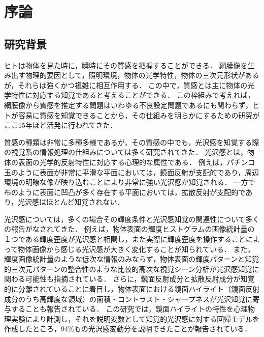 \chapter{序論}
    \section{研究背景}
        ヒトは物体を見た時に，瞬時にその質感を把握することができる．
        網膜像を生み出す物理的要因として，照明環境，物体の光学特性，物体の三次元形状があるが，それらは強くかつ複雑に相互作用する．
        この中で，質感とは主に物体の光学特性に対応する知覚であると考えることができる．
        この枠組みで考えれば，網膜像から質感を推定する問題はいわゆる不良設定問題であるにも関わらず，ヒトが容易に質感を知覚できることから，その仕組みを明らかにするための研究がここ15年ほど活発に行われてきた．

        質感の種類は非常に多種多様であるが\cite{Material}，その質感の中でも，光沢感を知覚する際の視覚系の情報処理の仕組みについては多く研究されてきた．
        光沢感とは，物体の表面の光学的反射特性に対応する心理的な属性である．
        例えば，パチンコ玉のように表面が非常に平滑な平面においては，鏡面反射が支配的であり，周辺環境の明瞭な像が映り込むことにより非常に強い光沢感が知覚される．
        一方で布のように表面に凹凸が多く存在する平面においては，拡散反射が支配的であり，光沢感はほとんど知覚されない．

        光沢感については，多くの場合その輝度条件と光沢感知覚の関連性について多くの報告がなされてきた．
        例えば，物体表面の輝度ヒストグラムの画像統計量の１つである輝度歪度が光沢感と相関し，また実際に輝度歪度を操作することによって物体画像から感じる光沢感が大きく変化することが知られている．\cite{Motoyoshi}
        また，輝度画像統計量のような低次な情報のみならず，物体表面の輝度パターンと知覚的三次元パターンの整合性のような比較的高次な視覚シーン分析が光沢感知覚に関わる可能性も指摘されている．\cite{Marlow1}
        さらに，鏡面反射成分と拡散反射成分が知覚的に分離されていることに着目し，物体表面における鏡面ハイライト（鏡面反射成分のうち高輝度な領域）の面積・コントラスト・シャープネスが光沢知覚に寄与することも報告されている．\cite{Marlow2}
        この研究では，鏡面ハイライトの特性を心理物理実験により計測し，それを説明変数として知覚的光沢感に対する回帰モデルを作成したところ，94\%もの光沢感変動分を説明できたことが報告されている．

